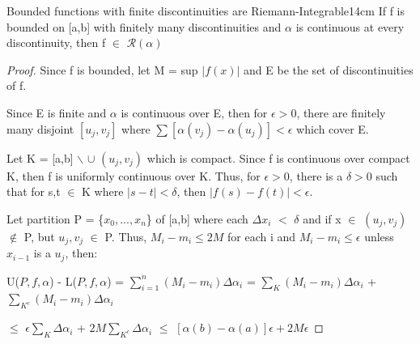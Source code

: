     \vspace{0.5cm}



    \begin{wtheorem}{Bounded functions with finite discontinuities
    are Riemann-Integrable}{14cm}
        If f is bounded on [a,b] with finitely many discontinuities
        and $\alpha$ is continuous at every discontinuity, then
        f $\in$ $\mathscr{R}(\alpha)$        
    \end{wtheorem}

    \begin{proof}
        Since f is bounded, let M = sup $|f(x)|$ and
        E be the set of discontinuities of f.

        Since E is finite and $\alpha$ is continuous over E, then
        for $\epsilon > 0$, there are finitely many disjoint
        $[u_j,v_j]$ where $\sum [\alpha(v_j) - \alpha(u_j)] < \epsilon$ which cover E.

        Let K = [a,b] $\backslash$ $\cup$ $(u_j,v_j)$ which is compact.
        Since f is continuous over compact K, then f is uniformly continuous
        over K.
        Thus, for $\epsilon > 0$, there is a $\delta > 0$ such that for
        s,t $\in$ K where $|s-t| < \delta$, then $|f(s) - f(t)| < \epsilon$.

        Let partition P = \{$x_0,...,x_n$\} of [a,b] where
        each $\Delta x_i$ $<$ $\delta$ and if x $\in$ 
        $(u_j,v_j)$ $\not \in$ P, but $u_j,v_j$ $\in$ P.
        Thus, $M_i - m_i \leq 2M$ for each i and
        $M_i - m_i \leq \epsilon$ unless
        $x_{i-1}$ is a $u_j$, then:

        \hspace{0.1cm}
        U($P,f,\alpha$) - L($P,f,\alpha$)
        = $\sum_{i=1}^n (M_i - m_i) \Delta \alpha_i$
        = $\sum_{K} (M_i - m_i) \Delta \alpha_i$
            + $\sum_{K^c} (M_i - m_i) \Delta \alpha_i$

        \hspace{3.9cm}
        $\leq$ $\epsilon \sum_{K} \Delta \alpha_i$
            + $2M \sum_{K^c} \Delta \alpha_i$
        $\leq$ $[\alpha(b) - \alpha(a)]\epsilon + 2M\epsilon$
    \end{proof}



